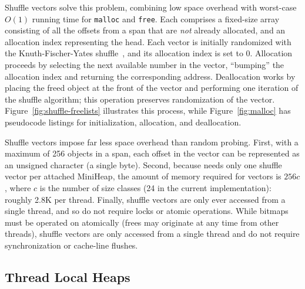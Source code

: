 Shuffle vectors solve this problem, combining low space overhead with
worst-case $O(1)$ running time for \texttt{malloc} and
\texttt{free}. Each comprises a fixed-size array consisting of all the
offsets from a span that are \textit{not} already allocated, and an
allocation index representing the head. Each vector is initially
randomized with the Knuth-Fischer-Yates
shuffle~\cite{knuth:1981:semi}, and its allocation index is set to
0. Allocation proceeds by selecting the next available number in the
vector, ``bumping'' the allocation index and returning the
corresponding address. Deallocation works by placing the freed object
at the front of the vector and performing one iteration of the shuffle
algorithm; this operation preserves randomization of the
vector. Figure~\ref{fig:shuffle-freelists} illustrates this process,
while Figure~\ref{fig:malloc} has pseudocode listings for
initialization, allocation, and deallocation.




Shuffle vectors impose far less space overhead than random
probing. First, with a maximum of 256 objects in a span, each offset
in the vector can be represented as an unsigned character (a single
byte). Second, because \Mesh needs only one shuffle vector per
attached MiniHeap, the amount of memory required for vectors is
$256c$, where $c$ is the number of size classes (24 in the current
implementation): roughly 2.8K per thread.  Finally, shuffle vectors
are only ever accessed from a single thread, and so do not require
locks or atomic operations.  While bitmaps must be operated on
atomically (frees may originate at any time from other threads),
shuffle vectors are only accessed from a single thread and do not
require synchronization or cache-line flushes.

\subsection{Thread Local Heaps}
\label{sec:thread-local-heaps}

